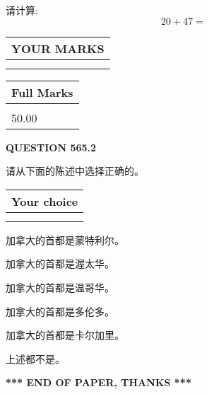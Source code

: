 \documentclass{ctexart}
\begin{document}
  
 
请计算:
\begin{equation}
20 +  %
47 = \nonumber
\end{equation}
 

 

 
  
\vspace{0.2in}
  
\noindent\begin{tabular}{|l|}
\hline
 YOUR MARKS  \\
\hline
 \\ 
 \\ 
\hline
\end{tabular}
\hspace{0.05in} \begin{tabular}{|l|}
\hline
 Full Marks  \\
\hline
 \\ 
50.00 \\
\hline
\end{tabular}
{\textbf{\Large{QUESTION
565.2 
}}}
  
  
请从下面的陈述中选择正确的。
  
  
\noindent\hspace{3.0in} \begin{tabular}{|l|}
\hline
Your choice \\
\hline
 \\ 
 \\ 
\hline
\end{tabular}
  
  
 
 
加拿大的首都是蒙特利尔。
 
 
加拿大的首都是渥太华。
 
 
加拿大的首都是温哥华。
 
 
加拿大的首都是多伦多。
 
 
加拿大的首都是卡尔加里。
 
 
 上述都不是。
 
 
   
   
 \vspace{0.2in}
 
   
   
   
   
\vspace{1.0in} 
{\textbf{\large{ *** END OF PAPER, THANKS *** }}} 
   
\end{document}
